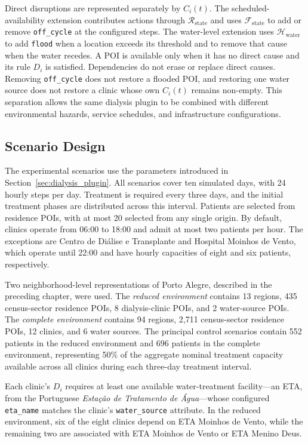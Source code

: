 Direct disruptions are represented separately by $C_i(t)$. The scheduled-availability extension contributes actions through $\mathcal{R}_{\mathrm{state}}$ and uses $\mathcal{F}_{\mathrm{state}}$ to add or remove \texttt{off\_}\allowbreak\texttt{cycle} at the configured steps. The water-level extension uses $\mathcal{H}_{\mathrm{water}}$ to add \texttt{flood} when a location exceeds its threshold and to remove that cause when the water recedes. A POI is available only when it has no direct cause and its rule $D_i$ is satisfied. Dependencies do not erase or replace direct causes. Removing \texttt{off\_}\allowbreak\texttt{cycle} does not restore a flooded POI, and restoring one water source does not restore a clinic whose own $C_i(t)$ remains non-empty. This separation allows the same dialysis plugin to be combined with different environmental hazards, service schedules, and infrastructure configurations.

\subsection{Scenario Design}

The experimental scenarios use the parameters introduced in Section~\ref{sec:dialysis_plugin}. All scenarios cover ten simulated days, with 24 hourly steps per day. Treatment is required every three days, and the initial treatment phases are distributed across this interval. Patients are selected from residence POIs, with at most 20 selected from any single origin. By default, clinics operate from 06:00 to 18:00 and admit at most two patients per hour. The exceptions are Centro de Diálise e Transplante and Hospital Moinhos de Vento, which operate until 22:00 and have hourly capacities of eight and six patients, respectively.

Two neighborhood-level representations of Porto Alegre, described in the preceding chapter, were used. The \textit{reduced environment} contains 13 regions, 435 census-sector residence POIs, 8 dialysis-clinic POIs, and 2 water-source POIs. The \textit{complete environment} contains 94 regions, 2,711 census-sector residence POIs, 12 clinics, and 6 water sources. The principal control scenarios contain 552 patients in the reduced environment and 696 patients in the complete environment, representing 50\% of the aggregate nominal treatment capacity available across all clinics during each three-day treatment interval.

Each clinic's $D_i$ requires at least one available water-treatment facility---an ETA, from the Portuguese \textit{Estação de Tratamento de Água}---whose configured \texttt{eta\_name} matches the clinic's \texttt{water\_source} attribute. In the reduced environment, six of the eight clinics depend on ETA Moinhos de Vento, while the remaining two are associated with ETA Moinhos de Vento or ETA Menino Deus.
 


